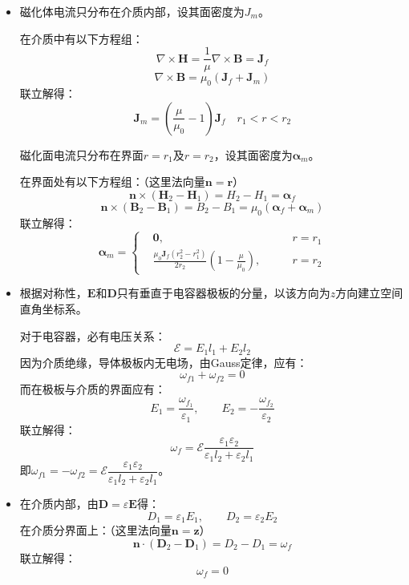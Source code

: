 \documentclass[a4paper,fontset=none]{ctexart}
\begin{document}
\begin{itemize}
        \item[8.(2)]
        \textparagraph 磁化体电流只分布在介质内部，设其面密度为$J_m$。

        在介质中有以下方程组：
        \[
            \nabla\times\bm{H} = \frac{1}{\mu}\nabla\times\bm{B} = \bm{J}_f
        \]
        \[
            \nabla\times\bm{B} = \mu_0(\bm{J}_f + \bm{J}_m)
        \]
        联立解得：
        \[
            \bm{J}_m = \left(\frac{\mu}{\mu_0} - 1\right)\bm{J}_f \quad r_1 < r < r_2
        \]

        \textparagraph 磁化面电流只分布在界面$r = r_1$及$r = r_2$，设其面密度为$\bm{\alpha}_m$。

        在界面处有以下方程组：（这里法向量$\bm{n} = \bm{r}$）
        \[
            \bm{n}\times(\bm{H}_2 - \bm{H}_1) = H_2 - H_1 = \bm{\alpha}_f
        \]
        \[
            \bm{n}\times(\bm{B}_2 - \bm{B}_1) = B_2 - B_1 = \mu_0\left(\bm{\alpha}_f + \bm{\alpha}_m\right)
        \]
        联立解得：
        \[
            \bm{\alpha}_m = \left\{
        \begin{aligned}
            & \bm{0},\qquad& r = r_1 \\
            & \frac{\mu_0 \bm{J}_f(r_2^2 - r_1^2)}{2r_2}\left(1 - \frac{\mu}{\mu_0}\right),\qquad& r = r_2
        \end{aligned}
        \right.
        \]

        \item[11.(1)]
        根据对称性，$\bm{E}$和$\bm{D}$只有垂直于电容器极板的分量，以该方向为$\hat{z}$方向建立空间直角坐标系。

        对于电容器，必有电压关系：
        \[
            \mathscr{E} = E_1 l_1 + E_2 l_2
        \]
        因为介质绝缘，导体极板内无电场，由Gauss定律，应有：
        \[
            \omega_{f1} + \omega_{f2} = 0
        \]
        而在极板与介质的界面应有：
        \[
            E_1 = \frac{\omega_{f_1}}{\varepsilon_1},\qquad E_2 = -\frac{\omega_{f_2}}{\varepsilon_2}
        \]
        联立解得：
        \[
            \omega_f = \mathscr{E}\frac{\varepsilon_1 \varepsilon_2}{\varepsilon_1 l_2 + \varepsilon_2 l_1}
        \]
        即$\omega_{f1} = -\omega_{f2} = \mathscr{E}\dfrac{\varepsilon_1 \varepsilon_2}{\varepsilon_1 l_2 + \varepsilon_2 l_1}$。

        \item[11.(2)]
        \textparagraph 在介质内部，由$\bm{D} = \varepsilon\bm{E}$得：
        \[
            D_1 = \varepsilon_1 E_1,\qquad D_2 = \varepsilon_2 E_2
        \]
        在介质分界面上：（这里法向量$\bm{n} = \bm{z}$）
        \[
            \bm{n}\cdot(\bm{D}_2 - \bm{D}_1) = D_2 - D_1 = \omega_f
        \]
        联立解得：
        \[
            \omega_f = 0
        \]


\end{itemize}
\end{document}

